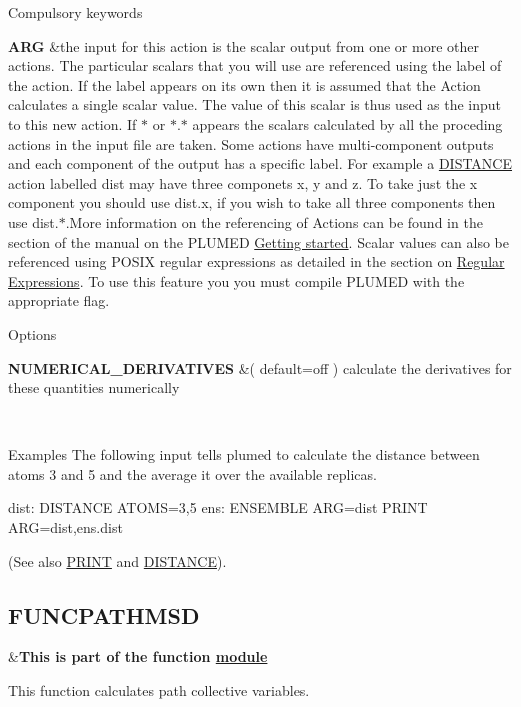 \begin{DoxyParagraph}{Compulsory keywords}

\end{DoxyParagraph}
\begin{TabularC}{2}
\hline
{\bfseries  A\+R\+G } &the input for this action is the scalar output from one or more other actions. The particular scalars that you will use are referenced using the label of the action. If the label appears on its own then it is assumed that the Action calculates a single scalar value. The value of this scalar is thus used as the input to this new action. If $\ast$ or $\ast$.$\ast$ appears the scalars calculated by all the proceding actions in the input file are taken. Some actions have multi-\/component outputs and each component of the output has a specific label. For example a \hyperlink{DISTANCE}{D\+I\+S\+T\+A\+N\+C\+E} action labelled dist may have three componets x, y and z. To take just the x component you should use dist.\+x, if you wish to take all three components then use dist.$\ast$.More information on the referencing of Actions can be found in the section of the manual on the P\+L\+U\+M\+E\+D \hyperlink{_syntax}{Getting started}. Scalar values can also be referenced using P\+O\+S\+I\+X regular expressions as detailed in the section on \hyperlink{Regex}{Regular Expressions}. To use this feature you you must compile P\+L\+U\+M\+E\+D with the appropriate flag.   \\
\end{TabularC}


\begin{DoxyParagraph}{Options}

\end{DoxyParagraph}
\begin{TabularC}{2}
\hline
{\bfseries  N\+U\+M\+E\+R\+I\+C\+A\+L\+\_\+\+D\+E\+R\+I\+V\+A\+T\+I\+V\+E\+S } &( default=off ) calculate the derivatives for these quantities numerically  

\\
\end{TabularC}


\begin{DoxyParagraph}{Examples}
The following input tells plumed to calculate the distance between atoms 3 and 5 and the average it over the available replicas. \begin{DoxyVerb}dist: DISTANCE ATOMS=3,5 
ens: ENSEMBLE ARG=dist
PRINT ARG=dist,ens.dist
\end{DoxyVerb}
 (See also \hyperlink{PRINT}{P\+R\+I\+N\+T} and \hyperlink{DISTANCE}{D\+I\+S\+T\+A\+N\+C\+E}). 
\end{DoxyParagraph}
\hypertarget{FUNCPATHMSD}{}\subsection{F\+U\+N\+C\+P\+A\+T\+H\+M\+S\+D}\label{FUNCPATHMSD}
\begin{TabularC}{2}
\hline
&{\bfseries  This is part of the function \hyperlink{mymodules}{module }}   \\
\end{TabularC}
This function calculates path collective variables.

